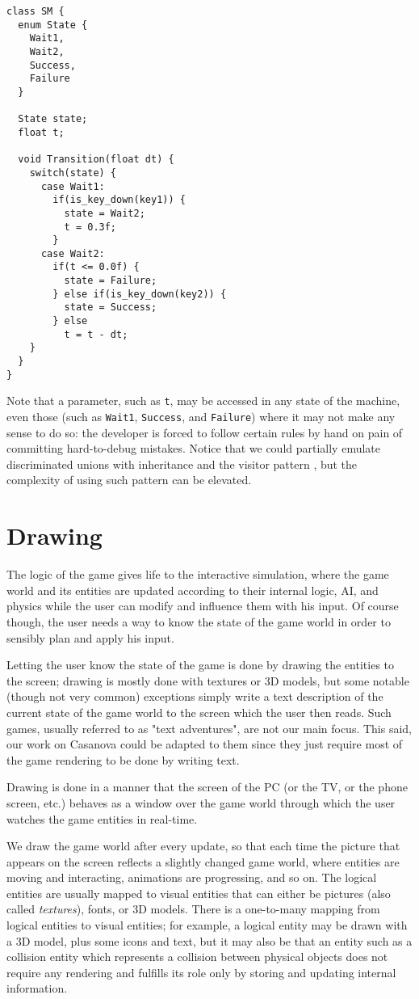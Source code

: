 \begin{lstlisting}
class SM {
  enum State {
    Wait1,
    Wait2,
    Success,
    Failure
  }
  
  State state;
  float t;
  
  void Transition(float dt) {
    switch(state) {
      case Wait1:
        if(is_key_down(key1)) {
          state = Wait2;
          t = 0.3f;
        }
      case Wait2:
        if(t <= 0.0f) {
          state = Failure;
        } else if(is_key_down(key2)) {
          state = Success;
        } else 
          t = t - dt;
    }
  }
}
\end{lstlisting}

Note that a parameter, such as \texttt{t}, may be accessed in any state of the machine, even those (such as \texttt{Wait1}, \texttt{Success}, and \texttt{Failure}) where it may not make any sense to do so: the developer is forced to follow certain rules by hand on pain of committing hard-to-debug mistakes. Notice that we could partially emulate discriminated unions with inheritance and the visitor pattern \cite{CHAPTER_2_VISITOR_PATTERN}, but the complexity of using such pattern can be elevated.

\section{Drawing}
The logic of the game gives life to the interactive simulation, where the game world and its entities are updated according to their internal logic, AI, and physics while the user can modify and influence them with his input. Of course though, the user needs a way to know the state of the game world in order to sensibly plan and apply his input.

Letting the user know the state of the game is done by drawing the entities to the screen; drawing is mostly done with textures or 3D models, but some notable (though not very common) exceptions simply write a text description of the current state of the game world to the screen which the user then reads. Such games, usually referred to as "text adventures", are not our main focus. This said, our work on Casanova could be adapted to them since they just require most of the game rendering to be done by writing text.

Drawing is done in a manner that the screen of the PC (or the TV, or the phone screen, etc.) behaves as a window over the game world through which the user watches the game entities in real-time.

We draw the game world after every update, so that each time the picture that appears on the screen reflects a slightly changed game world, where entities are moving and interacting, animations are progressing, and so on. The logical entities are usually mapped to visual entities that can either be pictures (also called \textit{textures}), fonts, or 3D models. There is a one-to-many mapping from logical entities to visual entities; for example, a logical entity may be drawn with a 3D model, plus some icons and text, but it may also be that an entity such as a collision entity which represents  a collision between physical objects does not require any rendering and fulfills its role only by storing and updating internal information.

